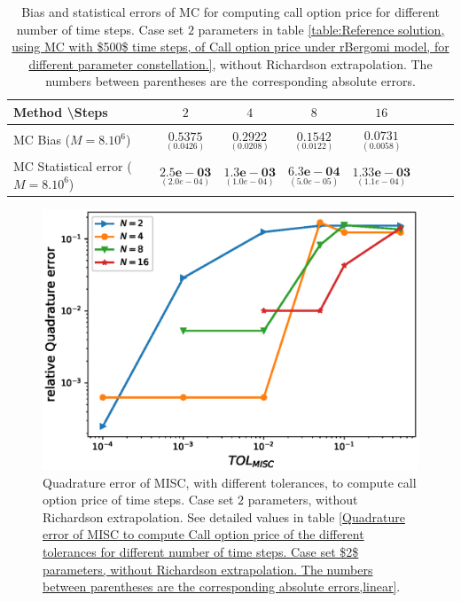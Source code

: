 \begin{table}[!h]
	\centering
	\begin{tabular}{l*{6}{c}r}
		Method \textbackslash  Steps            & $2$ & $4$ & $8$ & $16$  \\
		\hline
		MC Bias ($M=8.10^6$)   & $\underset{(0.0426)}{\mathbf{0.5375
		}}$  & $\underset{ (  0.0208)}{\mathbf{0.2922}}$  & $\underset{(  0.0122)}{\mathbf{0.1542}}$ & $\underset{( 0.0058)}{\mathbf{0.0731}}$  \\	
		
		MC Statistical error ($M=8.10^6$)  & $\underset{( 2.0e-04)}{\mathbf{2.5e-03}}$  & $\underset{(  1.0e-04)}{\mathbf{1.3e-03}}$  & $\underset{(  5.0e-05)}{\mathbf{6.3e-04}}$ & $\underset{(  1.1e-04)}{\mathbf{1.33e-03}}$ \\	
	
		\hline
	\end{tabular}
	\caption{Bias and statistical errors of MC  for computing call option price  for different number of time steps. Case set $2$ parameters in table \ref{table:Reference solution, using MC with $500$ time steps, of Call option price under rBergomi model, for different parameter constellation.}, without Richardson extrapolation. The numbers between parentheses are the corresponding absolute errors.}
	\label{Bias and Statistical errors of MC ($M=10^6$)  for computing Call option price  for different number of time steps. Case set $2$ parameters, without Richardson extrapolation. The numbers between parentheses are the corresponding absolute errors.}
\end{table}





\begin{figure}[h!]
	\centering
	\includegraphics[width=0.4\linewidth]{./figures/rBergomi_MISC_quadratre_error/vs_TOL/set2/relative_quad_error_wrt_MISC_TOL_set2_non_rich_linear}
	
	
	\caption{Quadrature error of MISC, with different tolerances, to compute call option price  of time steps. Case  set $2$ parameters, without Richardson extrapolation.  See detailed values  in table \ref{Quadrature error of MISC to compute Call option price of the different tolerances for different number of time steps. Case  set $2$ parameters, without Richardson extrapolation. The numbers between parentheses are the corresponding absolute errors,linear}.}
	\label{fig:Quadrature_error_set2_linear}
\end{figure}


